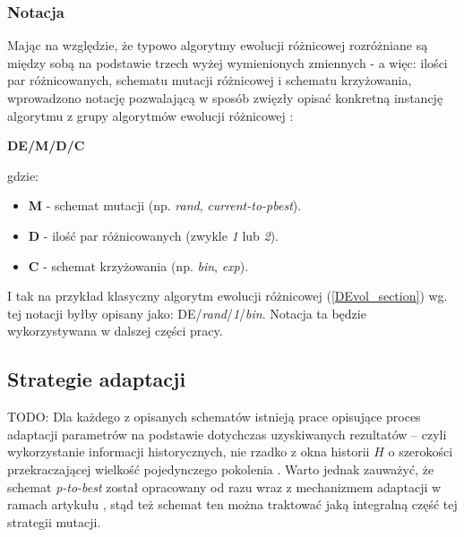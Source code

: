 \documentclass[12pt,a4paper]{report}
\begin{document}
{{{\subsubsection{Notacja}
\par{
Mając na względzie, że typowo algorytmy ewolucji różnicowej rozróżniane są między sobą na podstawie trzech wyżej wymienionych zmiennych - a więc: ilości par różnicowanych, schematu mutacji różnicowej i schematu krzyżowania, wprowadzono notację pozwalającą w sposób zwięzły opisać konkretną instancję algorytmu z grupy algorytmów ewolucji różnicowej \cite{PracticalInsights}:
\begin{center}
\textbf{DE/M/D/C}
\end{center}
gdzie:
\begin{itemize}
\item \textbf{M} - schemat mutacji (np. \emph{rand}, \emph{current-to-pbest}).
\item \textbf{D} - ilość par różnicowanych (zwykle \emph{1} lub \emph{2}).
\item \textbf{C} - schemat krzyżowania (np. \emph{bin}, \emph{exp}).
\end{itemize}
I tak na przykład klasyczny algorytm ewolucji różnicowej (\ref{DEvol_section}) wg. tej notacji byłby opisany jako: DE/\emph{rand}/\emph{1}/\emph{bin}. Notacja ta będzie wykorzystywana w dalszej części pracy.
}


\subsection{Strategie adaptacji}
\par{
TODO:
Dla każdego z opisanych schematów istnieją prace opisujące proces adaptacji parametrów na podstawie dotychczas uzyskiwanych rezultatów -- czyli wykorzystanie informacji historycznych, nie rzadko z okna historii $H$ o szerokości przekraczającej wielkość pojedynczego pokolenia \cite{zhang2009adaptive,JADE,SHADE}. Warto jednak zauważyć, że schemat \emph{p-to-best} został opracowany od razu wraz z mechanizmem adaptacji w ramach artykułu \cite{JADE}, stąd też schemat ten można traktować jaką integralną część tej strategii mutacji.
}
}}}
\end{document}
